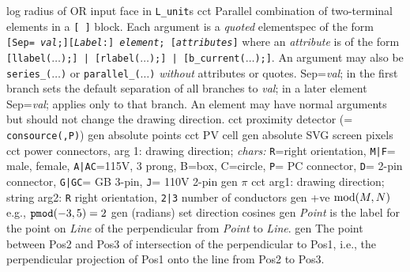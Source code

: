   {log}
  {radius of OR input face in {\tt L\_unit}s}
%
  {cct}
  { Parallel combination of two-terminal elements in a {\tt [
  ]} block.
    Each argument is a {\em quoted} elementspec of the form {\tt[Sep={\sl
    val};][{\sl Label}:] {\sl element}; [{\sl attributes}]} where
    an {\sl attribute} is of the form {\tt[llabel($\ldots$);] |
    [rlabel($\ldots$);] | [b\_current($\ldots$);]}.  An argument may
    also be {\tt series\_($\ldots$)} or {\tt parallel\_($\ldots$)} {\em
    without} attributes or quotes.  Sep={\sl val}; in the first branch
    sets the default separation of all branches to {\sl val}; in a later
    element Sep={\sl val}; applies only to that branch.  An element may
    have normal arguments but should not change the drawing direction.
   }
  {cct}
  {proximity detector (= {\tt consource(,P)})}
  {gen}
  {absolute points}
  {cct}
  {PV cell}
  {gen}
  {absolute SVG screen pixels}
  {cct}
  {power connectors, arg 1: drawing direction; {\sl chars:}
   {\tt R}=right orientation, {\tt M|F}= male, female, {\tt A|AC}=115V,
   3 prong, B=box, C=circle, {\tt P}= PC connector, {\tt D}= 2-pin
   connector, {\tt G|GC}= GB 3-pin, {\tt J}= 110V 2-pin
    }
  {gen}
  {$\pi$}
  {cct}
  {arg1: drawing direction; string arg2: {\tt R} right orientation,
   {\tt 2|3} number of conductors }
  {gen}
  {+ve $\hbox{mod}(M,N)$ e.g., $\hbox{\tt pmod}(-3,5)=2$}
  {gen}
  {(radians) set direction cosines}
  {gen}
  {{\sl Point} is the label for the point on {\sl Line} of the
  perpendicular
   from {\sl Point} to {\sl Line}.}
  {gen}
  {The point between Pos2 and Pos3 of intersection of the perpendicular
   to Pos1, i.e., the perpendicular projection of Pos1 onto the line
   from Pos2 to Pos3.}
